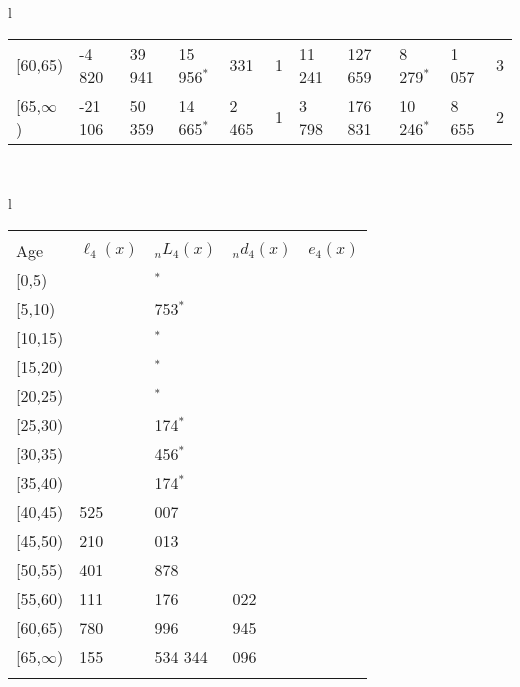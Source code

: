 \documentclass[
]{article}
\begin{document}
\begin{table}
\begin{tabular}[t]{l}
\begin{tabular}
{}[60,65) & -4 820 & 39 941 & 15 956$^{*}$ & 331 & 1 & 11 241 & 127 659 & 8 279$^{*}$ & 1 057 & 3\\
{}[65,$\infty$) & -21 106 & 50 359 & 14 665$^{*}$ & 2 465 & 1 & 3 798 & 176 831 & 10 246$^{*}$ & 8 655 & 2\\
\end{tabular}\\
\end{tabular}
\centering
\begin{tabular}[t]{l}
\hline
\begin{tabular}{>{\raggedright\arraybackslash}p{.43in}>{\raggedleft\arraybackslash}p{1.3in}>{\raggedleft\arraybackslash}p{1.3in}>{\raggedleft\arraybackslash}p{1.3in}>{\raggedleft\arraybackslash}p{1.3in}}
\toprule
\multicolumn{1}{c}{ } & \multicolumn{4}{c}{(4) Lost both} \\
\cmidrule(l{3pt}r{3pt}){2-5}
Age & $\ell_{4}(x)$ & ${}_nL_{4}(x)$ & ${}_nd_{4}(x)$ & $e_{4}(x)$\\
\midrule
{}[0,5) & 0 & 0$^{*}$ & 0 & 22\\
{}[5,10) & 0 & 1 753$^{*}$ & 0 & 22\\
{}[10,15) & 0 & 0$^{*}$ & 0 & 22\\
{}[15,20) & 0 & 0$^{*}$ & 0 & 22\\
{}[20,25) & 0 & 0$^{*}$ & 0 & 22\\
\addlinespace
{}[25,30) & 0 & 2 174$^{*}$ & 1 & 22\\
{}[30,35) & 737 & 14 456$^{*}$ & 12 & 22\\
{}[35,40) & 725 & 10 174$^{*}$ & 10 & 22\\
{}[40,45) & 3 525 & 39 007 & 53 & 22\\
{}[45,50) & 9 210 & 47 013 & 103 & 22\\
\addlinespace
{}[50,55) & 11 401 & 130 878 & 443 & 22\\
{}[55,60) & 22 111 & 196 176 & 1 022 & 21\\
{}[60,65) & 31 780 & 234 996 & 1 945 & 19\\
{}[65,$\infty$) & 56 155 & 1 534 344 & 75 096 & 17\\
\bottomrule
\multicolumn{5}{l}{\rule{0pt}{1em}\textsuperscript{*} Based on an estimated from SIPP with less than 10 respondents in the numerator.}\\
\end{tabular}\\
\end{tabular}
\end{table}
\end{document}
